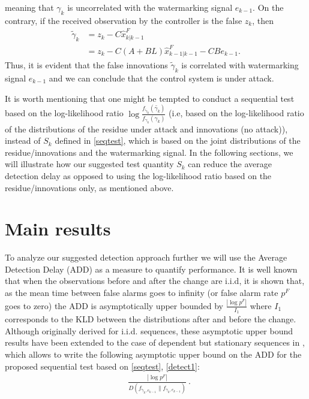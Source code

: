 \documentclass[journal,10pt]{IEEEtran}
\begin{document}
meaning that $\gamma_{k}$ is uncorrelated
with the watermarking signal $e_{k-1}$.  On the
contrary, if the received observation by the controller is the false
$z_{k}$, then
\begin{align}
 \tilde{\gamma}_{k} & =z_{k}-C\hat{x}^F_{k|k-1} \nonumber \\ 
& =z_{k}-C(A+BL)\hat{x}^F_{k-1|k-1}-CBe_{k-1}.\label{eq2}
\end{align}
Thus, it is evident that the false innovations $\tilde{\gamma}_{k}$ is correlated with watermarking
signal $e_{k-1}$ and we can conclude that the control system is under attack.

It is worth mentioning that  one might be tempted to conduct a sequential test 
 based on the log-likelihood ratio 
$\log\frac{f_{\widetilde{\gamma}_{k}}(\widetilde{\gamma_{k}})}{f_{\gamma_{k}}(\gamma_{k})}$ (i.e, based on the log-likelihood ratio of the distributions of the residue under attack and innovations (no attack)), 
instead of $S_k$ defined in \eqref{seqtest}, which is based on the joint distributions of the residue/innovations and the watermarking signal. In the following sections, we will illustrate how our suggested test quantity $S_k$ can reduce  the average detection delay as opposed to using the log-likelihood ratio based on the residue/innovations only, as mentioned above.

\section{Main results}

To analyze our suggested detection approach further we will use
the Average Detection Delay (ADD) as a measure to quantify performance. It is well known that 
\cite{quick, quickest_detection_book} when the observations before and after the change are i.i.d, it is shown that, as the mean time between false alarms goes to infinity (or false alarm rate $p^{F}$ goes to zero) 
the ADD is asymptotically upper bounded by $\frac{|\log p^{F}|}{I_1}$ where $I_1$ corresponds to the KLD between the distributions after and before the change. Although originally derived for i.i.d. sequences, these asymptotic upper bound results have been extended to the case of dependent but stationary sequences in \cite{tartakovsky_dependent}, which allows to write the following asymptotic upper bound on the ADD for the proposed sequential test based on \eqref{seqtest}, \eqref{detect1}:
\begin{align}
& \frac{|\log p^{F}|}{D(f_{\widetilde{\gamma}_{k}, e_{k-1}}\|f_{\gamma_{k}, e_{k-1}})}\ .
\end{align}
\end{document}
